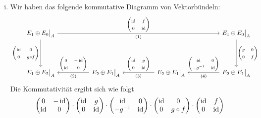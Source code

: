 \begin{enumerate}[(i)]
	\item Wir haben das folgende kommutative Diagramm von Vektorbündeln:
	\[
		\begin{tikzcd}[ampersand replacement=\&,row sep=4.5em,column sep=5.2em]
			E_1 \oplus E_0\big|_A \ar[rrr,"{\begin{pmatrix} \id & f \\ 0 & \id \end{pmatrix}}","\text{(1)}"'] \ar[d,"{\begin{pmatrix} \id & 0 \\ 0 & g \circ f \end{pmatrix}}"'] 
			\& \& \& E_1 \oplus E_0\big|_A \ar[d,"{\begin{pmatrix} g & 0 \\ 0 & f \end{pmatrix}}"] \\
			E_1 \oplus E_2\big|_A \& E_2 \oplus E_1\big|_A \lar["{\begin{pmatrix} 0 & -\id \\ \id & 0 \end{pmatrix}}"',"\text{(2)}"]
			\& E_2 \oplus E_1\big|_A \lar["{\begin{pmatrix} \id & g \\ 0 & \id \end{pmatrix}}"',"\text{(3)}"]
			\& E_2 \oplus E_1\big|_A \lar["{\begin{pmatrix} \id & 0 \\ - g^{-1} & \id \end{pmatrix}}"',"\text{(4)}"]
		\end{tikzcd}
	\]
	Die Kommutativität ergibt sich wie folgt
	\begin{align*}
		&\begin{pmatrix} 0 & -\id \\ \id & 0 \end{pmatrix} \cdot \begin{pmatrix} \id & g \\ 0 & \id \end{pmatrix} \cdot \begin{pmatrix} \id & 0 \\ - g^{-1} & \id \end{pmatrix}
		\cdot \begin{pmatrix} \id & 0 \\ 0 & g \circ f \end{pmatrix} \cdot \begin{pmatrix} \id & f \\ 0 & \id \end{pmatrix} \\

\end{align*}
\end{enumerate}
